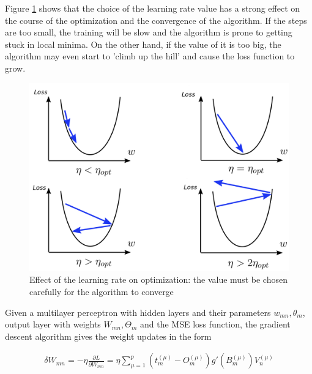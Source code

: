 Figure \ref{learning_rate} shows that the choice of the learning rate value has a strong effect on the course of the optimization and the convergence of the algorithm. If the steps are too small, the training will be slow and the algorithm is prone to getting stuck in local minima. On the other hand, if the value of it is too big, the algorithm may even start to 'climb up the hill' and cause the loss function to grow. \cite{mehlig} 

\newpage

\vspace{3mm}
\begin{figure}[htb]
	\begin{center}
		\includegraphics*[width=14cm, keepaspectratio]{obr/learning_rate.png}
	\end{center}
	\vspace{3mm}
	\caption{Effect of the learning rate on optimization: the value must be chosen carefully for the algorithm to converge \cite{coors}} 
	\label{learning_rate}
\end{figure}

Given a multilayer perceptron with hidden layers and their parameters $ w_{mn}, \theta_m $, output layer with weights $ W_{mn}, \Theta_m $ and the MSE loss function, the gradient descent algorithm gives the weight updates in the form \cite{mehlig}

\begin{gather}
	\delta W_{mn} = - \eta \frac{\partial L}{\partial W_{mn}} = \eta \sum\limits_{\mu=1}^{p}
	(t_{m}^{(\mu)} - O_{m}^{(\mu)})   g'(B_{m}^{(\mu)})     V_{n}^{(\mu)}
\end{gather}


